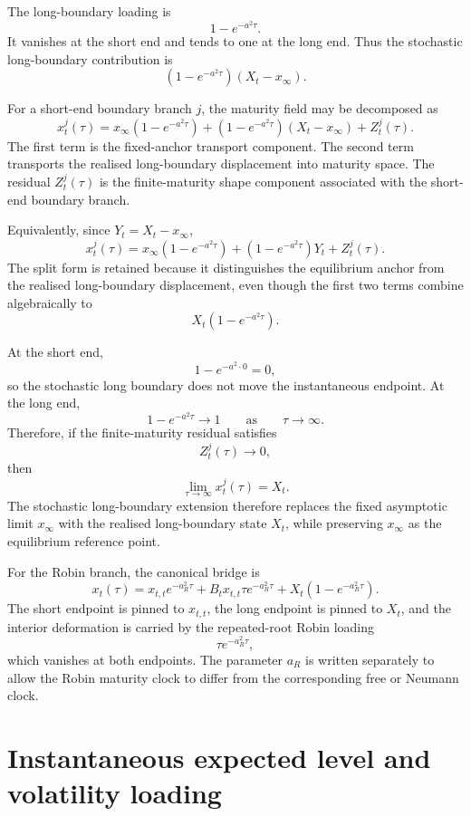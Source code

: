 \documentclass[11pt]{article}
\numberwithin{equation}{section}
\begin{document}
The long-boundary loading is
\[
1-e^{-a^2\tau}.
\]
It vanishes at the short end and tends to one at the long end. Thus the stochastic long-boundary contribution is
\[
\left(1-e^{-a^2\tau}\right)(X_t-x_\infty).
\]

For a short-end boundary branch \(j\), the maturity field may be decomposed as
\begin{equation}
\label{eq:boundary-decomposition}
x_t^j(\tau)
=
x_\infty\left(1-e^{-a^2\tau}\right)
+
\left(1-e^{-a^2\tau}\right)(X_t-x_\infty)
+
Z_t^j(\tau).
\end{equation}
The first term is the fixed-anchor transport component. The second term transports the realised long-boundary displacement into maturity space. The residual \(Z_t^j(\tau)\) is the finite-maturity shape component associated with the short-end boundary branch.

Equivalently, since \(Y_t=X_t-x_\infty\),
\[
x_t^j(\tau)
=
x_\infty\left(1-e^{-a^2\tau}\right)
+
\left(1-e^{-a^2\tau}\right)Y_t
+
Z_t^j(\tau).
\]
The split form is retained because it distinguishes the equilibrium anchor from the realised long-boundary displacement, even though the first two terms combine algebraically to
\[
X_t\left(1-e^{-a^2\tau}\right).
\]

At the short end,
\[
1-e^{-a^2\cdot 0}=0,
\]
so the stochastic long boundary does not move the instantaneous endpoint. At the long end,
\[
1-e^{-a^2\tau}\to1
\qquad
\text{as}
\qquad
\tau\to\infty.
\]
Therefore, if the finite-maturity residual satisfies
\[
Z_t^j(\tau)\to0,
\]
then
\[
\lim_{\tau\to\infty}x_t^j(\tau)=X_t.
\]
The stochastic long-boundary extension therefore replaces the fixed asymptotic limit \(x_\infty\) with the realised long-boundary state \(X_t\), while preserving \(x_\infty\) as the equilibrium reference point.

For the Robin branch, the canonical bridge is
\begin{equation}
\label{eq:canonical-bridge}
x_t(\tau)
=
x_{t,t}e^{-a_R^2\tau}
+
B_tx_{t,t}\tau e^{-a_R^2\tau}
+
X_t\left(1-e^{-a_R^2\tau}\right).
\end{equation}
The short endpoint is pinned to \(x_{t,t}\), the long endpoint is pinned to \(X_t\), and the interior deformation is carried by the repeated-root Robin loading
\[
\tau e^{-a_R^2\tau},
\]
which vanishes at both endpoints. The parameter \(a_R\) is written separately to allow the Robin maturity clock to differ from the corresponding free or Neumann clock.

\section{Instantaneous expected level and volatility loading}
\end{document}
